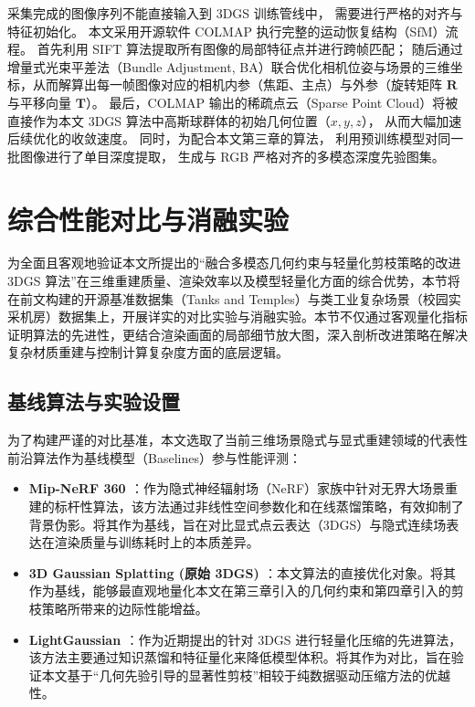 采集完成的图像序列不能直接输入到 3DGS 训练管线中，
需要进行严格的对齐与特征初始化。
本文采用开源软件 COLMAP \cite{schonberger2016structure} 执行完整的运动恢复结构（SfM）流程。
首先利用 SIFT 算法提取所有图像的局部特征点并进行跨帧匹配；
随后通过增量式光束平差法（Bundle Adjustment, BA）联合优化相机位姿与场景的三维坐标，从而解算出每一帧图像对应的相机内参（焦距、主点）与外参（旋转矩阵 $\mathbf{R}$ 与平移向量 $\mathbf{T}$）。
最后，COLMAP 输出的稀疏点云（Sparse Point Cloud）将被直接作为本文 3DGS 算法中高斯球群体的初始几何位置（$x, y, z$），
从而大幅加速后续优化的收敛速度。
同时，为配合本文第三章的算法，
利用预训练模型对同一批图像进行了单目深度提取，
生成与 RGB 严格对齐的多模态深度先验图集。



\section{综合性能对比与消融实验}
\label{sec:experiments_and_ablation}

为全面且客观地验证本文所提出的“融合多模态几何约束与轻量化剪枝策略的改进 3DGS 算法”在三维重建质量、渲染效率以及模型轻量化方面的综合优势，本节将在前文构建的开源基准数据集（Tanks and Temples）与类工业复杂场景（校园实采机房）数据集上，开展详实的对比实验与消融实验。本节不仅通过客观量化指标证明算法的先进性，更结合渲染画面的局部细节放大图，深入剖析改进策略在解决复杂材质重建与控制计算复杂度方面的底层逻辑。

\subsection{基线算法与实验设置}
\label{subsec:baselines}

为了构建严谨的对比基准，本文选取了当前三维场景隐式与显式重建领域的代表性前沿算法作为基线模型（Baselines）参与性能评测：
\begin{itemize}
    \item \textbf{Mip-NeRF 360 \cite{barron2022mipnerf360}}：作为隐式神经辐射场（NeRF）家族中针对无界大场景重建的标杆性算法，该方法通过非线性空间参数化和在线蒸馏策略，有效抑制了背景伪影。将其作为基线，旨在对比显式点云表达（3DGS）与隐式连续场表达在渲染质量与训练耗时上的本质差异。
    \item \textbf{3D Gaussian Splatting (原始 3DGS) \cite{kerbl20233d}}：本文算法的直接优化对象。将其作为基线，能够最直观地量化本文在第三章引入的几何约束和第四章引入的剪枝策略所带来的边际性能增益。
    \item \textbf{LightGaussian \cite{fan2024lightgaussian}}：作为近期提出的针对 3DGS 进行轻量化压缩的先进算法，该方法主要通过知识蒸馏和特征量化来降低模型体积。将其作为对比，旨在验证本文基于“几何先验引导的显著性剪枝”相较于纯数据驱动压缩方法的优越性。
\end{itemize}

